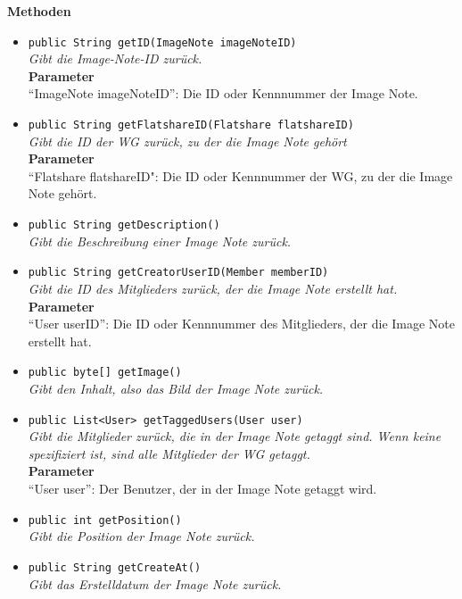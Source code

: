 	\textbf{Methoden}
	\begin{itemize}
		\item\texttt{{public String getID(ImageNote imageNoteID)}}\\
		\textit{Gibt die Image-Note-ID zurück.}\\
		\textbf{Parameter}\\
		“ImageNote imageNoteID”: Die ID oder Kennnummer der Image Note.\\
		
		\item\texttt{{public String getFlatshareID(Flatshare flatshareID)}}\\
		\textit{Gibt die ID der WG zurück, zu der die Image Note gehört}\\
		\textbf{Parameter}\\
		``Flatshare flatshareID": Die ID oder Kennnummer der WG, zu der die Image Note gehört.
		
		\item\texttt{{public String getDescription()}}\\
		\textit{Gibt die Beschreibung einer Image Note zurück.}\\
		
		\item\texttt{{public String getCreatorUserID(Member memberID)}}\\
		\textit{Gibt die ID des Mitglieders zurück, der die Image Note erstellt hat.}\\
		\textbf{Parameter}\\
		“User userID”: Die ID oder Kennnummer des Mitglieders, der die Image Note erstellt hat.\\
		
		\item\texttt{{public byte[] getImage()}}\\
		\textit{Gibt den Inhalt, also das Bild der Image Note zurück.}\\
		
		\item\texttt{{public List<User> getTaggedUsers(User user)}}\\
		\textit{Gibt die Mitglieder zurück, die in der Image Note getaggt sind. Wenn keine spezifiziert ist, sind alle Mitglieder der WG getaggt.}\\
		\textbf{Parameter}\\
		“User user”: Der Benutzer, der in der Image Note getaggt wird.\\
		
		\item\texttt{{public int getPosition()}}\\
		\textit{Gibt die Position der Image Note zurück.}\\
		
		\item\texttt{{public String getCreateAt()}}\\
		\textit{Gibt das Erstelldatum der Image Note zurück.}\\
	\end{itemize}

